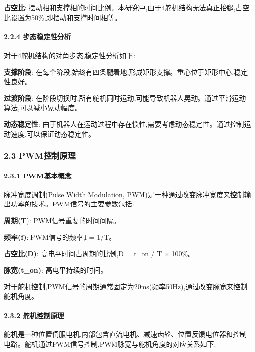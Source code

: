 \documentclass[
]{article}
\begin{document}
\textbf{占空比}:
摆动相和支撑相的时间比例。本研究中,由于4舵机结构无法真正抬腿,占空比设置为50\%,即摆动和支撑时间相等。

\hypertarget{ux6b65ux6001ux7a33ux5b9aux6027ux5206ux6790}{%
\paragraph{2.2.4
步态稳定性分析}\label{ux6b65ux6001ux7a33ux5b9aux6027ux5206ux6790}}

对于4舵机结构的对角步态,稳定性分析如下:

\textbf{支撑阶段}:
在每个阶段,始终有四条腿着地,形成矩形支撑。重心位于矩形中心,稳定性良好。

\textbf{过渡阶段}:
在阶段切换时,所有舵机同时运动,可能导致机器人晃动。通过平滑运动算法,可以减小晃动幅度。

\textbf{动态稳定性}:
由于机器人在运动过程中存在惯性,需要考虑动态稳定性。通过控制运动速度,可以保证动态稳定性。

\hypertarget{pwmux63a7ux5236ux539fux7406}{%
\subsubsection{2.3 PWM控制原理}\label{pwmux63a7ux5236ux539fux7406}}

\hypertarget{pwmux57faux672cux6982ux5ff5}{%
\paragraph{2.3.1 PWM基本概念}\label{pwmux57faux672cux6982ux5ff5}}

脉冲宽度调制(Pulse Width Modulation,
PWM)是一种通过改变脉冲宽度来控制输出功率的技术。PWM信号的主要参数包括:

\textbf{周期(T)}: PWM信号重复的时间间隔。

\textbf{频率(f)}: PWM信号的频率,f = 1/T。

\textbf{占空比(D)}: 高电平时间占周期的比例,D = t\_on / T × 100\%。

\textbf{脉宽(t\_on)}: 高电平持续的时间。

对于舵机控制,PWM信号的周期通常固定为20ms(频率50Hz),通过改变脉宽来控制舵机角度。

\hypertarget{ux8235ux673aux63a7ux5236ux539fux7406}{%
\paragraph{2.3.2
舵机控制原理}\label{ux8235ux673aux63a7ux5236ux539fux7406}}

舵机是一种位置伺服电机,内部包含直流电机、减速齿轮、位置反馈电位器和控制电路。舵机通过PWM信号控制,PWM脉宽与舵机角度的对应关系如下:
\end{document}
